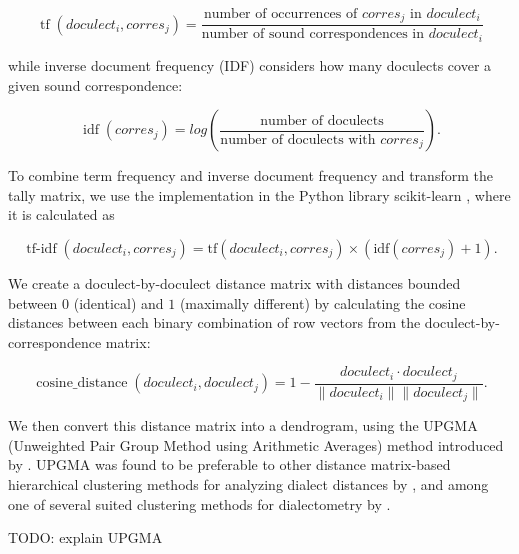 \documentclass[a4paper]{article}
\begin{document}
\begin{equation*}
\operatorname{tf}(doculect_i, corres_j) =
\frac{\text{number of occurrences of } corres_j \text{ in } doculect_i}
{\text{number of sound correspondences in } doculect_i}
\end{equation*}

while inverse document frequency (IDF)
considers how many doculects cover a given
sound correspondence:

\begin{equation*}
\operatorname{idf}(corres_j) =
log(
\frac{\text{number of doculects}}
{\text{number of doculects with } corres_j}
).
\end{equation*}

To combine term frequency and inverse document frequency
and transform the tally matrix, 
we use the implementation in the Python library scikit-learn
\citep{pedregosa2011scikit-learn},
where it is calculated as

\begin{equation*}
\operatorname{tf-idf}(doculect_i, corres_j) =
\text{tf}(doculect_i, corres_j)
\times
(
\text{idf}(corres_j)
+ 1).
\end{equation*}


We create a doculect-by-doculect distance matrix
with distances bounded between $0$ (identical) and $1$ (maximally different)
by calculating the cosine distances between each
binary combination of row vectors from the doculect-by-correspondence matrix:

\begin{equation*}
\operatorname{cosine\_distance}(doculect_i,doculect_j) =
1 -
\frac{doculect_i \cdot doculect_j}{\lVert doculect_i \rVert \lVert doculect_j \rVert}
.
\end{equation*}

We then convert this distance matrix into a dendrogram,
using the UPGMA
(Unweighted Pair Group Method using Arithmetic Averages)
method introduced by \citet{sokal1958statistical}.
UPGMA was found to be preferable to other
distance matrix-based hierarchical clustering methods
for analyzing dialect distances by \citet{heeringa2004measuring},
and among one of several suited clustering methods for dialectometry
by \citet{prokic2008recognizing}.

TODO: explain UPGMA
\end{document}
